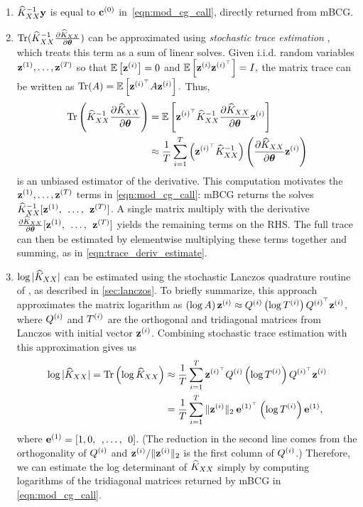 \begin{enumerate}
  \item $\widehat{K}_{XX}^{-1}\mathbf{y}$ is equal to $\mathbf{c}^{(0)}$ in~\cref{eqn:mod_cg_call}, directly returned from mBCG.

  \item $\tr{ \trainK^{-1} \frac{\partial \trainK}{\partial \btheta} }$ can be approximated using \emph{stochastic trace estimation} \cite{hutchinson1990stochastic,fitzsimons2016improved}, which treats this term as a sum of linear solves.
    Given i.i.d. random variables $\mathbf{z}^{(1)}, \ldots, \mathbf{z}^{(T)}$ so that $\operatorname*{\mathbb{E}} \left[ \mathbf{z}^{(i)} \right]=0$ and $\operatorname*{\mathbb{E}} \left[ \mathbf{z}^{(i)} \mathbf{z}^{(i)^\top} \right]=I,
    $
    the matrix trace can be written as
    $
      \tr{\bA} = \Ev{\bz^{(i)^\top} \bA\bz^{(i)}}.
    $
    Thus,
    \begin{align}
      \tr{\trainK^{-1}\frac{\partial \trainK}{\partial \btheta}} &= \Ev{\bz^{(i)^\top} \trainK^{-1} \frac{\partial \trainK}{\partial \btheta} \bz^{(i)}}
      \nonumber \\
      &\approx \frac{1}{T}\sum_{i=1}^{T}\left(\bz^{(i)^\top} \trainK^{-1}\right)\left(\frac{\partial \trainK}{\partial \btheta}\bz^{(i)} \right)
      \label{eqn:trace_deriv_estimate}
    \end{align}
    is an unbiased estimator of the derivative. This computation motivates the $\mathbf{z}^{(1)}, \ldots, \mathbf{z}^{(T)}$ terms in \cref{eqn:mod_cg_call}:
    mBCG returns the solves $\widehat{K}_{XX}^{-1}[\mathbf{z}^{(1)}, \:\: \ldots, \:\: \mathbf{z}^{(T)}]$.
    A single matrix multiply with the derivative $\frac{\partial \widehat{K}_{XX}}{\partial \boldsymbol{\theta}}[\mathbf{z}^{(1)}, \:\: \ldots, \:\: \mathbf{z}^{(T)}]$ yields the remaining terms on the RHS.
    The full trace can then be estimated by elementwise multiplying these terms together and summing, as in \cref{eqn:trace_deriv_estimate}.

  \item $\log \vert \widehat{K}_{XX} \vert$
    can be estimated using the stochastic Lanczos quadrature routine of \citet{ubaru2017fast}, as described in \cref{sec:lanczos}.
    To briefly summarize, this approach approximates the matrix logarithm as $\left( \log A \right) \mathbf{z}^{(i)} \approx Q^{(i)} \left( \log T^{(i)} \right) Q^{(i)^\top} \mathbf{z}^{(i)}$,
    where $Q^{(i)}$ and $T^{(i)}$ are the orthogonal and tridiagonal matrices from Lanczos with initial vector $\mathbf{z}^{(i)}$.
    Combining stochastic trace estimation with this approximation gives us
    \begin{align*}
      \log \vert \trainK \vert = \tr{ \log \trainK }
      &\approx \frac{1}{T} \sum_{i=1}^T \bz^{(i)^\top} \bQ^{(i)} \left( \log \bT^{(i)} \right) \bQ^{(i)^\top} \bz^{(i)}
      \\
      &= \frac{1}{T} \sum_{i=1}^T \Vert \bz^{(i)} \Vert_2 \: \be^{(1)^\top} \left( \log \bT^{(i)} \right) \be^{(1)},
    \end{align*}
    where $\mathbf{e}^{(1)} = [1, 0, \:\:, \ldots, \:\: 0]$.
    (The reduction in the second line comes from the orthogonality of $Q^{(i)}$ and $\mathbf{z}^{(i)} / \Vert \mathbf{z}^{(i)} \Vert_2$ is the first column of $Q^{(i)}$.)
    Therefore, we can estimate the log determinant of $\widehat{K}_{XX}$ simply by computing logarithms of the tridiagonal matrices returned by mBCG in \cref{eqn:mod_cg_call}.
\end{enumerate}
